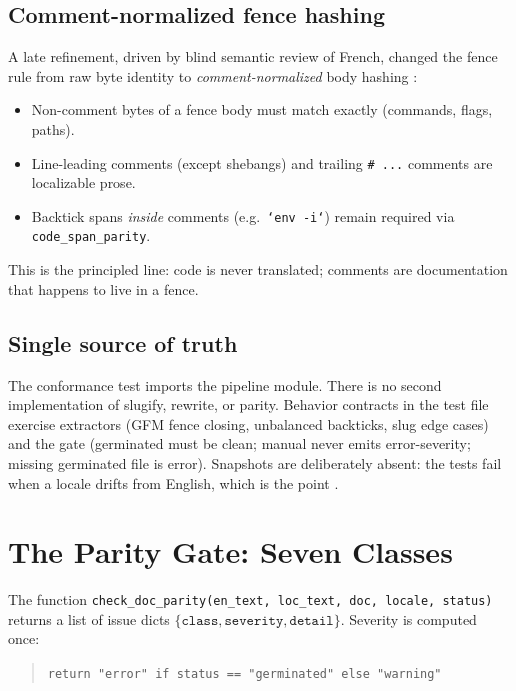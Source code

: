 \documentclass[11pt]{article}
\theoremstyle{definition}
\theoremstyle{plain}
\theoremstyle{remark}
\begin{document}
\subsection{Comment-normalized fence hashing}

A late refinement, driven by blind semantic review of French, changed the
fence rule from raw byte identity to \emph{comment-normalized} body hashing
\citep{hermespr80391}:

\begin{itemize}[leftmargin=*]
\item Non-comment bytes of a fence body must match exactly (commands, flags,
  paths).
\item Line-leading comments (except shebangs) and trailing \texttt{\# ...}
  comments are localizable prose.
\item Backtick spans \emph{inside} comments (e.g.\ \texttt{`env -i`}) remain
  required via \texttt{code\_span\_parity}.
\end{itemize}

This is the principled line: code is never translated; comments are
documentation that happens to live in a fence.

\subsection{Single source of truth}

The conformance test imports the pipeline module. There is no second
implementation of slugify, rewrite, or parity. Behavior contracts in the test
file exercise extractors (GFM fence closing, unbalanced backticks, slug edge
cases) and the gate (germinated must be clean; manual never emits
error-severity; missing germinated file is error). Snapshots are deliberately
absent: the tests fail when a locale drifts from English, which is the point
\citep{hermespr80391}.


\section{The Parity Gate: Seven Classes}
\label{sec:gate}

The function \texttt{check\_doc\_parity(en\_text, loc\_text, doc, locale,
status)} returns a list of issue dicts
$\{\texttt{class}, \texttt{severity}, \texttt{detail}\}$. Severity is
computed once:

\begin{quote}
\texttt{return "error" if status == "germinated" else "warning"}
\end{quote}
\end{document}

